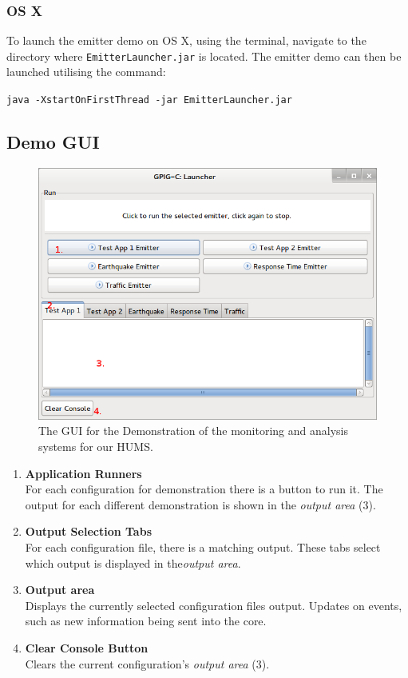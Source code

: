 \documentclass[10pt,a4paper]{article}
\begin{document}
\subsubsection{OS X}
To launch the emitter demo on OS X, using the terminal, navigate to the directory where \texttt{EmitterLauncher.jar} is located. The emitter demo can then be launched utilising the command:
\begin{center}
\texttt{java -XstartOnFirstThread -jar EmitterLauncher.jar}
\end{center}

\subsection{Demo GUI}
\begin{figure}[H]
  \centering
  \includegraphics[width=\textwidth]{images/demo-gui.png}
  \caption{The GUI for the Demonstration of the monitoring and analysis systems for our HUMS.}
  \label{fig:demogui}
\end{figure}
\begin{enumerate}
\item \textbf{Application Runners} \\ For each configuration for demonstration there is a button to run it. The output for each different demonstration is shown in the \emph{output area} ($3$).
\item \textbf{Output Selection Tabs} \\ For each configuration file, there is a matching output. These tabs select which output is displayed in the\emph{output area}.
\item \textbf{Output area} \\ Displays the currently selected configuration files output. Updates on events, such as new information being sent into the core.
\item \textbf{Clear Console Button} \\ 
Clears the current configuration's \emph{output area} ($3$).
\end{enumerate}
\end{document}
